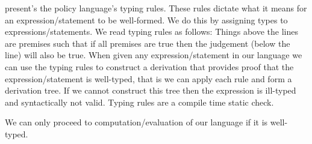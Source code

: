  present's the policy language's typing rules.
These rules dictate what it means for an expression/statement to be well-formed.
We do this by assigning types to expressions/statements.
We read typing rules as follows: Things above the lines are premises such that if all premises are true then the judgement (below the line) will also be true.
When given any expression/statement in our language we can use the typing rules to construct a derivation that provides proof that the expression/statement is well-typed, that is we can apply each rule and form a derivation tree.
If we cannot construct this tree then the expression is ill-typed and syntactically not valid.
Typing rules are a compile time static check.

We can only proceed to computation/evaluation of our language if it is well-typed.
